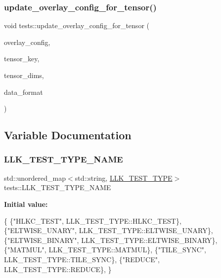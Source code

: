 \mbox{\label{namespacetests_aa762ecf88c7b287d4a449b8bfd701d82}} 
\subsubsection{\texorpdfstring{update\+\_\+overlay\+\_\+config\+\_\+for\+\_\+tensor()}{update\_overlay\_config\_for\_tensor()}}
{\footnotesize\ttfamily void tests\+::update\+\_\+overlay\+\_\+config\+\_\+for\+\_\+tensor (\begin{DoxyParamCaption}\item[{\hyperlink{structtests_1_1OverlayConfig}{Overlay\+Config} \&}]{overlay\+\_\+config,  }\item[{std\+::string}]{tensor\+\_\+key,  }\item[{\hyperlink{structllk_1_1TensorDims}{llk\+::\+Tensor\+Dims}}]{tensor\+\_\+dims,  }\item[{Data\+Format}]{data\+\_\+format }\end{DoxyParamCaption})}



\subsection{Variable Documentation}
\mbox{\label{namespacetests_a29444f10f17f711fe976c141033f5048}} 
\subsubsection{\texorpdfstring{L\+L\+K\+\_\+\+T\+E\+S\+T\+\_\+\+T\+Y\+P\+E\+\_\+\+N\+A\+ME}{LLK\_TEST\_TYPE\_NAME}}
{\footnotesize\ttfamily std\+::unordered\+\_\+map$<$std\+::string, \hyperlink{namespacetests_a25585fda9706046718066368a7a86897}{L\+L\+K\+\_\+\+T\+E\+S\+T\+\_\+\+T\+Y\+PE}$>$ tests\+::\+L\+L\+K\+\_\+\+T\+E\+S\+T\+\_\+\+T\+Y\+P\+E\+\_\+\+N\+A\+ME}

{\bfseries Initial value\+:}
\begin{DoxyCode}
\{
    \{\textcolor{stringliteral}{"HLKC\_TEST"}, LLK\_TEST\_TYPE::HLKC\_TEST\},
    \{\textcolor{stringliteral}{"ELTWISE\_UNARY"}, LLK\_TEST\_TYPE::ELTWISE\_UNARY\},
    \{\textcolor{stringliteral}{"ELTWISE\_BINARY"}, LLK\_TEST\_TYPE::ELTWISE\_BINARY\},
    \{\textcolor{stringliteral}{"MATMUL"}, LLK\_TEST\_TYPE::MATMUL\},
    \{\textcolor{stringliteral}{"TILE\_SYNC"}, LLK\_TEST\_TYPE::TILE\_SYNC\},
    \{\textcolor{stringliteral}{"REDUCE"}, LLK\_TEST\_TYPE::REDUCE\},
\}
\end{DoxyCode}
